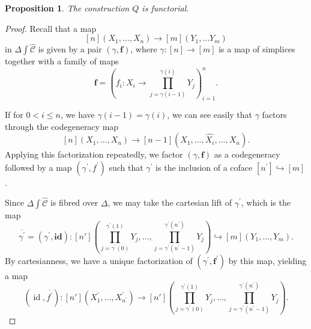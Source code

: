 \documentclass{amsart}
\numberwithin{equation}{section}
\theoremstyle{plain}   %
\newtheorem{prop}[subsection]{Proposition}
\theoremstyle{remark}
\theoremstyle{plain}
\DeclareMathOperator{\id}{id}
\newcommand{\psh}[1]{\ensuremath{\widehat{#1}}}
\newcommand{\C}{\ensuremath{\mathcal{C}}}
\begin{document}
\begin{prop} The construction \(Q\) is functorial.
\end{prop}
\begin{proof}
	Recall that a map \[[n](X_1,\dots, X_n) \to [m](Y_1,\dots Y_m)\] in \(\Delta \int \psh{\C}\) is given by a pair \((\gamma,\mathbf{f})\), where \(\gamma:[n]\to [m]\) is a map of simplices together with a family of maps \[\mathbf{f}=\left(f_i: X_i \to \prod_{j=\gamma(i-1)}^{\gamma(i)}Y_j\right)_{i=1}^n.\]

	If for \(0<i\leq n\), we have \(\gamma(i-1)=\gamma(i)\), we can see easily that \(\gamma\) factors through the codegeneracy map \[[n](X_1,\dots,X_n)\to [n-1](X_1,\dots,\psh{X_i},\dots,X_n).\]  Applying this factorization repeatedly, we factor \((\gamma,\mathbf{f})\) as a codegeneracy followed by a map \((\gamma^\prime,f^\prime)\) such that \(\gamma^\prime\) is the inclusion of a coface \([n^\prime]\hookrightarrow [m]\).

	Since \(\Delta\int \psh{\C}\) is fibred over \(\Delta\), we may take the cartesian lift of \(\gamma^\prime\), which is the map \[\overline{\gamma^\prime}=(\gamma^\prime,\mathbf{id}):[n']\left(\prod_{j=\gamma^\prime(0)}^{\gamma^\prime(1)}Y_j, \dots, \prod_{j=\gamma^\prime(n^\prime-1)}^{\gamma^\prime(n^\prime)} Y_j \right)\hookrightarrow [m](Y_1,\dots,Y_m).\]  By cartesianness, we have a unique factorization of \((\gamma^\prime,\mathbf{f^\prime})\) by this map, yielding a map \[(\id,\overline{f^\prime}):[n'](X^\prime_1,\dots,X^\prime_{n^\prime})\to [n']\left(\prod_{j=\gamma^\prime(0)}^{\gamma^\prime(1)}Y_j, \dots, \prod_{j=\gamma^\prime(n^\prime-1)}^{\gamma^\prime(n^\prime)} Y_j \right).\]


\end{proof}
\end{document}

